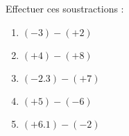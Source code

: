 
\begin{exercice}\label{exo2smath-0214}

    Effectuer ces soustractions :
    \begin{multicols}{2}
        \begin{enumerate}
            \item
                \( (-3)-(+2)\)
            \item
                \( (+4)-(+8)\)

            \item
                \( (-2.3)-(+7)\)
            \item
                \( (+5)-(-6)\)
            \item
                \( (+6.1)-(-2)\)
        \end{enumerate}
    \end{multicols}

\end{exercice}
